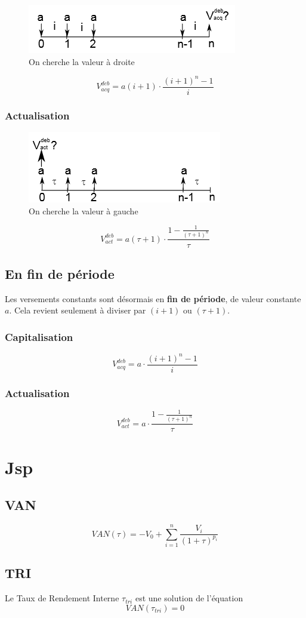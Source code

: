 \documentclass{article}
\begin{document}
\begin{figure}[H]
    \centering
    \includegraphics{versement-constant.png}
    \\On cherche la valeur à droite
\end{figure}

$$\boxed{V^{deb}_{acq} = a(i+1)\cdot\dfrac{(i+1)^n-1}{i}}$$

\subsubsection{Actualisation}

\begin{figure}[H]
    \centering
    \includegraphics{versement-constant-actu.png}
    \\On cherche la valeur à gauche
\end{figure}

$$\boxed{V^{deb}_{act} = a(\tau+1)\cdot\dfrac{1-\frac{1}{(\tau+1)^n}}{\tau}}$$


\subsection{En fin de période}
Les versements constants sont désormais en \textbf{fin de période}, de valeur constante $a$.
Cela revient seulement à diviser par $(i+1)$ ou $(\tau + 1)$.

\subsubsection{Capitalisation}
$$V^{deb}_{acq} = a\cdot\dfrac{(i+1)^n-1}{i}$$

\subsubsection{Actualisation}
$$V^{deb}_{act} = a\cdot\dfrac{1-\frac{1}{(\tau+1)^n}}{\tau}$$

\section {Jsp}
\subsection{VAN}
$$\boxed{VAN(\tau) = -V_0 + \sum_{i=1}^n \dfrac{V_i}{(1+\tau)^{p_i}}}$$
\subsection{TRI}
Le Taux de Rendement Interne $\tau_{tri}$ est une solution de l'équation 
$$VAN(\tau_{tri}) = 0$$
\end{document}
